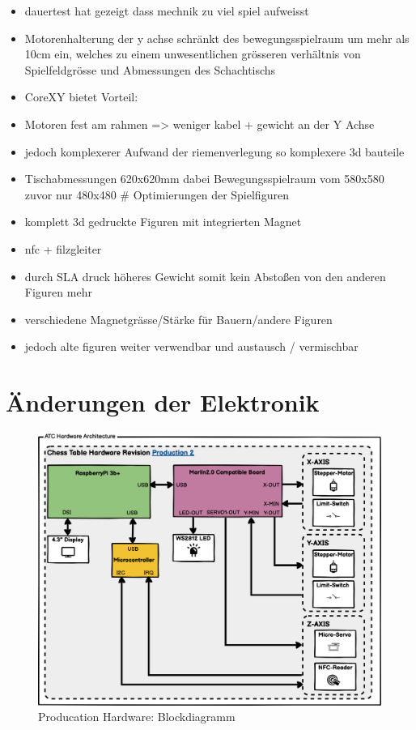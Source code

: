 \begin{itemize}
\item
  dauertest hat gezeigt dass mechnik zu viel spiel aufweisst
\item
  Motorenhalterung der y achse schränkt des bewegungsspielraum um mehr
  als 10cm ein, welches zu einem unwesentlichen grösseren verhältnis von
  Spielfeldgrösse und Abmessungen des Schachtischs
\item
  CoreXY bietet Vorteil:
\item
  Motoren fest am rahmen =\textgreater{} weniger kabel + gewicht an der
  Y Achse
\item
  jedoch komplexerer Aufwand der riemenverlegung so komplexere 3d
  bauteile
\item
  Tischabmessungen 620x620mm dabei Bewegungsspielraum vom 580x580 zuvor
  nur 480x480 \# Optimierungen der Spielfiguren
\item
  komplett 3d gedruckte Figuren mit integrierten Magnet
\item
  nfc + filzgleiter
\item
  durch SLA druck höheres Gewicht somit kein Abstoßen von den anderen
  Figuren mehr
\item
  verschiedene Magnetgrässe/Stärke für Bauern/andere Figuren
\item
  jedoch alte figuren weiter verwendbar und austausch / vermischbar
\end{itemize}

\hypertarget{uxe4nderungen-der-elektronik}{%
\section{Änderungen der Elektronik}\label{uxe4nderungen-der-elektronik}}

\begin{figure}
\centering
\includegraphics{images/ATC_Hardware_Architecture_PROD.png}
\caption{Producation Hardware: Blockdiagramm}
\end{figure}

